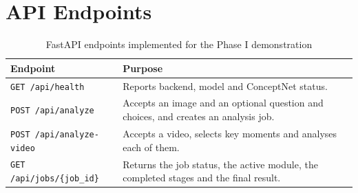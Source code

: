 \documentclass[12pt,a4paper,oneside]{report}
\newcommand{\code}[1]{\texttt{#1}}
\begin{document}
\chapter{API Endpoints}
\label{app:api}

\begin{table}[htbp]
\centering
\caption{FastAPI endpoints implemented for the Phase I demonstration}
\label{tab:api}
\small
\begin{tabularx}{\textwidth}{@{}p{5.2cm}L@{}}
\toprule
\textbf{Endpoint} & \textbf{Purpose}\\
\midrule
\code{GET /api/health} & Reports backend, model and ConceptNet status.\\
\code{POST /api/analyze} & Accepts an image and an optional question and choices, and creates an analysis job.\\
\code{POST /api/analyze-video} & Accepts a video, selects key moments and analyses each of them.\\
\code{GET /api/jobs/\{job\_id\}} & Returns the job status, the active module, the completed stages and the final result.\\
\bottomrule
\end{tabularx}
\end{table}
\end{document}
